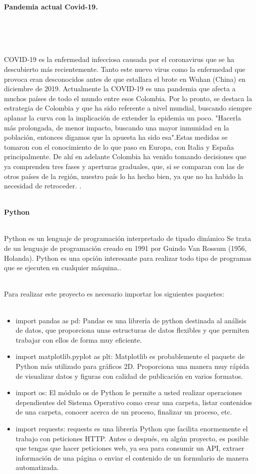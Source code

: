 \documentclass[conference,compsoc,onecolumn]{IEEEtran}
\begin{document}
\textbf{Pandemia actual Covid-19.}
\\\

\justify
\\\

COVID‑19 es la enfermedad infecciosa causada por el coronavirus que se ha descubierto más recientemente. Tanto este nuevo virus como la enfermedad que provoca eran desconocidos antes de que estallara el brote en Wuhan (China) en diciembre de 2019. Actualmente la COVID‑19 es una pandemia que afecta a muchos países de todo el mundo entre esos Colombia. Por lo pronto, se destaca la estrategia de Colombia y que ha sido referente a nivel mundial, buscando siempre aplanar la curva con la implicación de extender la epidemia un poco. "Hacerla más prolongada, de menor impacto, buscando una mayor inmunidad en la población, entonces digamos que la apuesta ha sido esa".Estas medidas se tomaron con el conocimiento de lo que paso en Europa, con Italia y España principalmente. De ahí en adelante Colombia ha venido tomando decisiones que ya comprenden tres fases y aperturas graduales, que, si se comparan con las de otros países de la región, nuestro país lo ha hecho bien, ya que no ha habido la necesidad de retroceder. .~\cite{1}
\\\

\textbf{Python}
\\\

Python es un lenguaje de programación interpretado de tipado dinámico Se trata de un lenguaje de programación creado en 1991 por Guindo Van Rossum (1956, Holanda). Python es una opción interesante para realizar todo tipo de programas que se ejecuten en cualquier máquina..~\cite{3}
\\\

Para realizar este proyecto es necesario importar los siguientes paquetes:
\\\

\begin{itemize}
\item import pandas as pd: Pandas es una librería de python destinada al análisis de datos, que proporciona unas estructuras de datos flexibles y que permiten trabajar con ellos de forma muy eficiente.~\cite{4}
\item import matplotlib.pyplot as plt: Matplotlib es probablemente el paquete de Python más utilizado para gráficos 2D. Proporciona una manera muy rápida de visualizar datos y figuras con calidad de publicación en varios formatos.~\cite{5}
\item import os: El módulo os de Python le permite a usted realizar operaciones dependientes del Sistema Operativo como crear una carpeta, listar contenidos de una carpeta, conocer acerca de un proceso, finalizar un proceso, etc.~\cite{6}
\item import requests: requests es una librería Python que facilita enormemente el trabajo con peticiones HTTP. Antes o después, en algún proyecto, es posible que tengas que hacer peticiones web, ya sea para consumir un API, extraer información de una página o enviar el contenido de un formulario de manera automatizada.~\cite{7}
\end{itemize}
\\\
\end{document}
